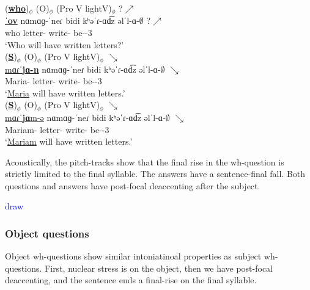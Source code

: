 \begin{exe}
	\ex \label{example:intontion:focus:wh:subj:peripbig}\begin{xlist}
		
		
		\ex \glll(\underline{\textbf{who}})$_\phi$ ({O})$_\phi$ (Pro V lightV)$_\phi$ ?$\nearrow$ \\
		\underline{ˈ\textbf{ov}} nɑmɑɡ-ˈneɾ bidi kʰəˈɾ-ɑd͡z  əlˈl-ɑ-$\emptyset$ ?$\nearrow$ \\
		who letter-{\pl} {\fut}  write-{\rptcp} be-{\thgloss}-3{\sg}\\ 
		\trans `Who will have written letters?'
		\\ 
		\ex \glll (\underline{\textbf{S}})$_\phi$  ({O})$_\phi$ (Pro  V lightV)$_\phi$ $\searrow$ \\
		\underline{mɑɾˈ\textbf{jɑ-n}}  nɑmɑɡ-ˈneɾ  bidi kʰəˈɾ-ɑd͡z  əlˈl-ɑ-$\emptyset$ $\searrow$ \\
		Maria-{} letter-{\pl}  {\fut} write-{\rptcp} be-{\thgloss}-3{\sg}\\ 
		\trans `\underline{Maria}  will have written letters.' 
		\\  
		\ex \glll (\underline{\textbf{S}})$_\phi$  ({O})$_\phi$ (Pro  V lightV)$_\phi$  $\searrow$ \\
		\underline{mɑɾˈ\textbf{jɑ}m-ə} nɑmɑɡ-ˈneɾ bidi  kʰəˈɾ-ɑd͡z    əlˈl-ɑ-$\emptyset$   $\searrow$ \\
		Mariam-{} letter-{\pl} {\fut} write-{\rptcp}  be-{\thgloss}-3{\sg} \\ 
		\trans `\underline{Mariam}     will have written letters.' 
		\\  
		
		
	\end{xlist}
\end{exe}

Acoustically, the pitch-tracks show that the final rise in the wh-question is strictly limited to the final syllable. The answers have a sentence-final fall. Both questions and answers have post-focal deaccenting after the subject. 

\textcolor{blue}{draw}


\subsubsection{Object questions} \label{section:intonation:focus:wh:obj}

Object wh-questions show similar intoniatinoal properties as subject wh-questions. First, nuclear stress is on the object, then we have post-focal deaccenting, and the sentence ends a final-rise on the final syllable. 

